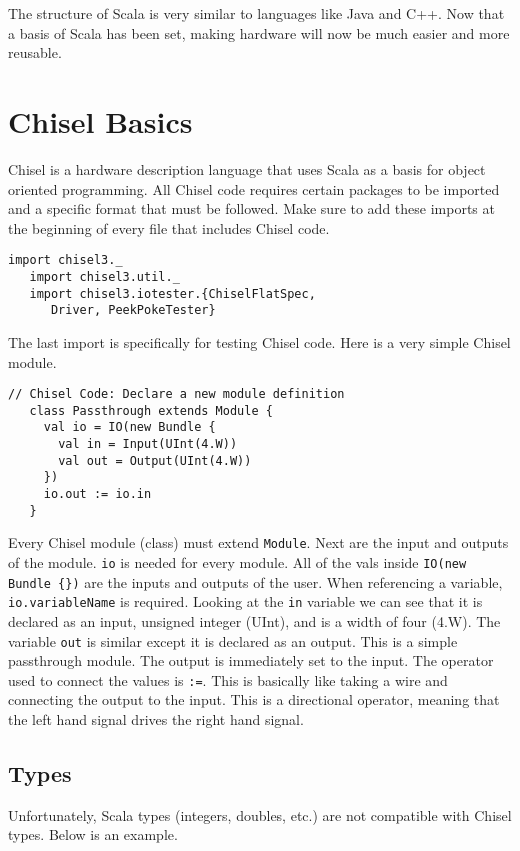 \documentclass[12pt, letterpaper]{report}
\begin{document}
The structure of Scala is very similar to languages like Java and C++. 
Now that a basis of Scala has been set, making hardware will now be much easier and more reusable.


\chapter{Chisel Basics}
Chisel is a hardware description language that uses Scala as a basis for object oriented programming. 
All Chisel code requires certain packages to be imported and a specific format that must be followed.
Make sure to add these imports at the beginning of every file that includes Chisel code.

\begin{lstlisting}[style=scala]
   import chisel3._
   import chisel3.util._
   import chisel3.iotester.{ChiselFlatSpec, 
      Driver, PeekPokeTester}
\end{lstlisting}

\noindent The last import is specifically for testing Chisel code. Here is a very simple Chisel module.

\begin{lstlisting}[style=scala]
   // Chisel Code: Declare a new module definition
   class Passthrough extends Module {
     val io = IO(new Bundle {
       val in = Input(UInt(4.W))
       val out = Output(UInt(4.W))
     })
     io.out := io.in
   }
\end{lstlisting}

\noindent Every Chisel module (class) must extend \verb|Module|. 
Next are the input and outputs of the module.
\verb|io| is needed for every module. 
All of the vals inside \verb|IO(new Bundle {})| are the inputs and outputs of the user. 
When referencing a variable, \verb|io.variableName| is required.
Looking at the \verb|in| variable we can see that it is declared as an input, unsigned integer (UInt), and is a width of four (4.W).
The variable \verb|out| is similar except it is declared as an output.
This is a simple passthrough module. 
The output is immediately set to the input.
The operator used to connect the values is \verb|:=|. 
This is basically like taking a wire and connecting the output to the input. 
This is a directional operator, meaning that the left hand signal drives the right hand signal. 
\section{Types}
Unfortunately, Scala types (integers, doubles, etc.) are not compatible with Chisel types. Below is an example.
\end{document}
